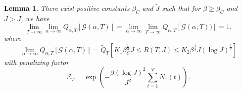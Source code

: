 \documentclass[12pt]{amsart}
\newtheorem{lemma}{Lemma}[section]
\numberwithin{equation}{section}
\newcommand{\1}{\mathbf{1}}
\begin{document}
\begin{lemma}
\label{interchange}
    There exist positive constants $\beta_C$ and $\tilde{J}$ such that for $\beta\geq\beta_C$ and $J>\tilde{J}$, we have
    \begin{equation*}
    \lim_{T\to\infty}\lim_{\alpha\to\infty}Q_{\alpha,T}[\mathcal{G}(\alpha,T)]=\lim_{\alpha\to\infty}\lim_{T\to\infty}Q_{\alpha,T}[\mathcal{G}(\alpha,T))] = 1,
    \end{equation*}
    where 
    \begin{equation*}
        \lim_{\alpha\to\infty}Q_{\alpha,T}[\mathcal{G}(\alpha,T)]=\widetilde{Q}_T\left[K_1\beta_C^{\frac{1}{3}}J\leq R(T,J)\leq K_2\beta^{\frac{1}{3}}J(\log J)^{\frac{1}{2}}\right]
    \end{equation*}
    with penalizing factor
    \begin{equation*}
    \widetilde{\mathcal{E}}_T=\exp\left(-\frac{\beta(\log J)^2}{J^2}\sum_{t=1}^TN_1(t)\right).
    \end{equation*}
\end{lemma}
\end{document}

